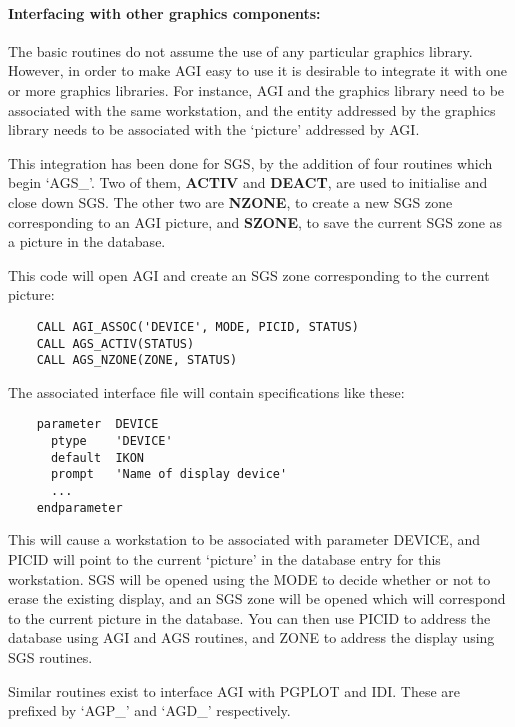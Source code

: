 \paragraph{Interfacing with other graphics components:}\hfill

The basic routines do not assume the use of any particular graphics
library.
However, in order to make AGI easy to use it is desirable to integrate it
with one or more graphics libraries.
For instance, AGI and the graphics library need to be associated with the
same workstation, and the entity addressed by the graphics library needs
to be associated with the `picture' addressed by AGI.

This integration has been done for SGS, by the addition of four routines which
begin `AGS\_'.
Two of them, {\bf ACTIV} and {\bf DEACT}, are used to initialise and close down
SGS.
The other two are {\bf NZONE}, to create a new SGS zone corresponding to an AGI
picture, and {\bf SZONE}, to save the current SGS zone as a picture in the
database.

This code will open AGI and create an SGS zone corresponding to the current
picture:

\begin{small}
\begin{verbatim}
    CALL AGI_ASSOC('DEVICE', MODE, PICID, STATUS)
    CALL AGS_ACTIV(STATUS)
    CALL AGS_NZONE(ZONE, STATUS)
\end{verbatim}
\end{small}

The associated interface file will contain specifications like these:

\begin{small}
\begin{verbatim}
    parameter  DEVICE
      ptype    'DEVICE'
      default  IKON
      prompt   'Name of display device'
      ...
    endparameter
\end{verbatim}
\end{small}

This will cause a workstation to be associated with parameter DEVICE, and PICID
will point to the current `picture' in the database entry for this workstation.
SGS will be opened using the MODE to decide whether or not to erase the
existing display, and an SGS zone will be opened which will correspond to the
current picture in the database.
You can then use PICID to address the database using AGI and AGS routines,
and ZONE to address the display using SGS routines.

Similar routines exist to interface AGI with PGPLOT and IDI.
These are prefixed by `AGP\_' and `AGD\_' respectively.

